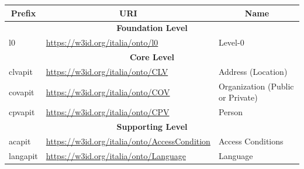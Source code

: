 \begin{longtable}[c]{lll}
  \hline
  \multicolumn{1}{|c|}{\textbf{Prefix}} & \multicolumn{1}{c|}{\textbf{\ac{URI}}}                                  & \multicolumn{1}{c|}{\textbf{Name}}         \\ \hline
  \endhead
  \multicolumn{3}{|c|}{\textbf{Foundation Level}}                                                                                                                            \\ \hline
  \multicolumn{1}{|p{0.2\textwidth}|}{l0}            & \multicolumn{1}{p{0.4\textwidth}|}{\url{https://w3id.org/italia/onto/l0}}               & \multicolumn{1}{p{0.4\textwidth}|}{Level-0}                                    \\ \hline
  \multicolumn{3}{|c|}{\textbf{Core Level}}                                                                                                                                  \\ \hline
  \multicolumn{1}{|p{0.2\textwidth}|}{clvapit}       & \multicolumn{1}{p{0.4\textwidth}|}{\url{https://w3id.org/italia/onto/CLV}}              & \multicolumn{1}{p{0.4\textwidth}|}{Address (Location)}                         \\ \hline
  \multicolumn{1}{|p{0.2\textwidth}|}{covapit}       & \multicolumn{1}{p{0.4\textwidth}|}{\url{https://w3id.org/italia/onto/COV}}              & \multicolumn{1}{p{0.4\textwidth}|}{Organization (Public or Private)}           \\ \hline
  \multicolumn{1}{|p{0.2\textwidth}|}{cpvapit}       & \multicolumn{1}{p{0.4\textwidth}|}{\url{https://w3id.org/italia/onto/CPV}}              & \multicolumn{1}{p{0.4\textwidth}|}{Person}                                     \\ \hline
  \multicolumn{3}{|c|}{\textbf{Supporting Level}}                                                                                                                            \\ \hline
  \multicolumn{1}{|p{0.2\textwidth}|}{acapit}        & \multicolumn{1}{p{0.4\textwidth}|}{\url{https://w3id.org/italia/onto/AccessCondition}}  & \multicolumn{1}{p{0.4\textwidth}|}{Access Conditions}                          \\ \hline
  \multicolumn{1}{|p{0.2\textwidth}|}{langapit}      & \multicolumn{1}{p{0.4\textwidth}|}{\url{https://w3id.org/italia/onto/Language}}         & \multicolumn{1}{p{0.4\textwidth}|}{Language}                                   \\ \hline

\end{longtable}
